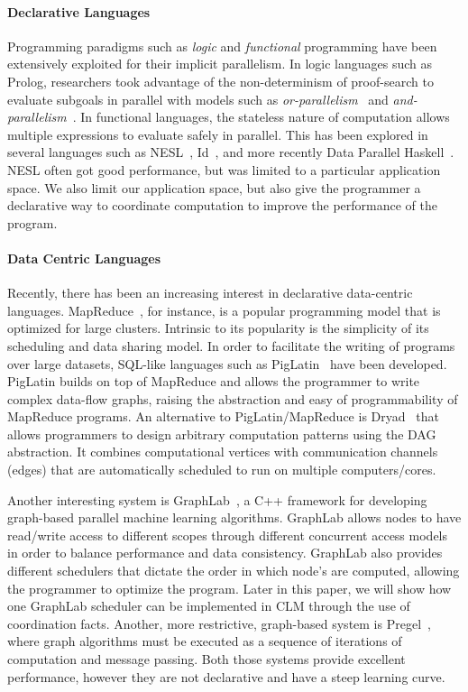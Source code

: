 
\paragraph{Declarative Languages}
Programming paradigms such as \emph{logic} and \emph{functional}
programming have been extensively exploited for their implicit parallelism.
In logic languages such as Prolog, researchers took advantage of the
non-determinism of proof-search to evaluate subgoals in parallel with models
such as \emph{or-parallelism}~\cite{ali-86} and
\emph{and-parallelism}~\cite{Shen-92}.  In functional languages, the stateless
nature of computation allows multiple expressions to evaluate safely in
parallel. This has been explored in several languages such as
NESL~\cite{Blelloch:1996:PPA:227234.227246}, Id~\cite{Nikhil93anoverview}, and
more recently Data Parallel Haskell~\cite{nepal}.
NESL often got good performance, but was limited to a particular
application space. We also limit our application space, but also give the
programmer a declarative way to coordinate computation to improve the
performance of the program.

\paragraph{Data Centric Languages}
Recently, there has been an increasing interest in declarative data-centric
languages. MapReduce~\cite{Dean:2008:MSD:1327452.1327492}, for instance, is a
popular programming model that is optimized for large clusters.
Intrinsic to its popularity is the simplicity of its scheduling and data sharing
model.  In order to facilitate the writing of programs over large datasets,
SQL-like languages such as PigLatin~\cite{Olston:2008:PLN:1376616.1376726} have
been developed.  PigLatin builds on top of MapReduce and allows the programmer
to write complex data-flow graphs, raising the abstraction and easy of
programmability of MapReduce programs.  An alternative to PigLatin/MapReduce is
Dryad~\cite{Isard:2007:DDD:1272996.1273005} that allows programmers to design
arbitrary computation patterns using the DAG abstraction. It combines
computational vertices with communication channels (edges) that are
automatically scheduled to run on multiple computers/cores.

Another interesting system is GraphLab~\cite{GraphLab2010}, a C++ framework for developing graph-based parallel machine
learning algorithms. GraphLab allows nodes to have read/write access to
different scopes through different concurrent access models in order to balance
performance and data consistency.  GraphLab also provides different schedulers
that dictate the order in which node's are computed, allowing the programmer to
optimize the program. Later in this paper, we will show how one GraphLab
scheduler can be implemented in CLM through the use of coordination facts.
Another, more restrictive, graph-based system is
Pregel~\cite{Malewicz:2010:PSL:1807167.1807184}, where graph algorithms must be
executed as a sequence of iterations of computation and message passing.
Both those systems provide excellent performance, however they are not
declarative and have a steep learning curve.

